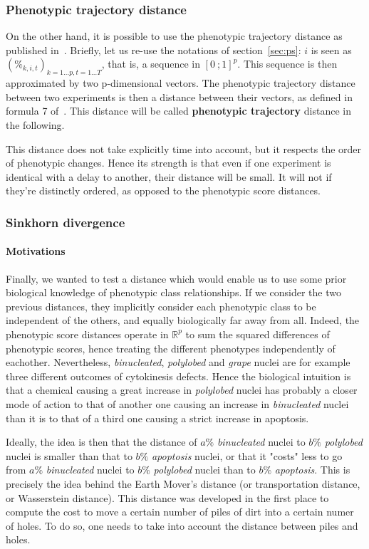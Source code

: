 \subsubsection*{Phenotypic trajectory distance}
On the other hand, it is possible to use the phenotypic trajectory distance as published in~\cite{Walter2010}. Briefly, let us re-use the notations of section~\ref{sec:ps}: $i$ is seen as $(\%_{k,i,t})_{k=1\ldots p,t=1\ldots T}$, that is, a sequence in $[0~;1]^p$. This sequence is then approximated by two p-dimensional vectors. The phenotypic trajectory distance between two experiments is then a distance between their vectors, as defined in formula 7 of~\cite{Walter2010}. This distance will be called \textbf{phenotypic trajectory} distance in the following.

This distance does not take explicitly time into account, but it respects the order of phenotypic changes. Hence its strength is that even if one experiment is identical with a delay to another, their distance will be small. It will not if they're distinctly ordered, as opposed to the phenotypic score distances.

\subsubsection*{Sinkhorn divergence}
\paragraph*{Motivations}
Finally, we wanted to test a distance which would enable us to use some prior biological knowledge of phenotypic class relationships. If we consider the two previous distances, they implicitly consider each phenotypic class to be independent of the others, and equally biologically far away from all. Indeed, the phenotypic score distances operate in $\mathbb{R}^p$ to sum the squared differences of phenotypic scores, hence treating the different phenotypes independently of eachother. Nevertheless, \textit{binucleated}, \textit{polylobed} and \textit{grape} nuclei are for example three different outcomes of cytokinesis defects. Hence the biological intuition is that a chemical causing a great increase in \textit{polylobed} nuclei has probably a closer mode of action to that of another one causing an increase in \textit{binucleated} nuclei than it is to that of a third one causing a strict increase in apoptosis.

Ideally, the idea is then that the distance of $a\%$ \textit{binucleated} nuclei to $b\%$ \textit{polylobed} nuclei is smaller than that to $b\%$ \textit{apoptosis} nuclei, or that it "costs" less to go from $a\%$ \textit{binucleated} nuclei to $b\%$ \textit{polylobed} nuclei than to $b\%$ \textit{apoptosis}. This is precisely the idea behind the Earth Mover's distance (or transportation distance, or Wasserstein distance). This distance was developed in the first place to compute the cost to move a certain number of piles of dirt into a certain numer of holes. To do so, one needs to take into account the distance between piles and holes.
